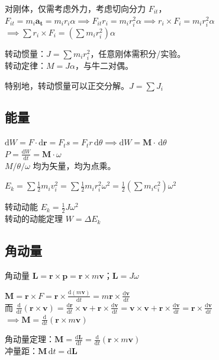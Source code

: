 \documentclass[12pt, a4paper, UTF8, openany]{ctexbook}
\newcommand{\dif}{\mathrm{d}}
\newcommand{\sdif}{\,\mathrm{d}}
\newcommand{\vect}[1]{\mathbf{#1}}
\newcommand{\vecr}{\vect{r}}
\newcommand{\vecv}{\vect{v}}
\newcommand{\vecat}{\vect{a_{t}}}
\newcommand{\vecp}{\vect{p}}
\newcommand{\vecm}{\vect{M}}
\newcommand{\vecl}{\vect{L}}
\newcommand{\cross}{\times}
\begin{document}
        对刚体，仅需考虑外力，考虑切向分力 $F_{it}$，
        $F_{it} = m_i\vecat = m_i r_i \alpha \implies F_{it} r_i = m_i r_i^2 \alpha 
        \implies r_i \cross F_i = m_i r_i^2 \alpha$ \\
        $\implies \sum r_i \cross F_i = (\sum m_i r_i^2) \alpha$

        转动惯量：$J = \sum m_i r_i^2$，任意刚体需积分/实验。\\
        转动定律：$M = J \alpha$，与牛二对偶。

        特别地，{\heiti 转动惯量可以正交分解}。$J = \sum J_i$

        \subsection{能量}
        $\dif W = F \cdot \dif \vecr = F_{t} s = F_{t} r \sdif\theta \implies \dif W = \vecm \cdot \sdif\theta$ \\
        $P = \frac{\dif W}{\dif t} = \vecm \cdot \omega$ \\
        $M/\theta/\omega$ 均为矢量，均为点乘。

        $E_{k} = \sum \frac{1}{2} m_i v_i^2 = \sum \frac{1}{2} m_i r_i^2 \omega^2 
        = \frac{1}{2}(\sum m_i c_i^2)\omega^2$

        转动动能 $E_{k} = \frac{1}{2} J \omega^2$ \\
        转动的动能定理 $W = \Delta E_{k}$

        \subsection{角动量}
        角动量 $\vecl = \vecr \cross \vecp = \vecr \cross m\vecv$；$\vecl = J\omega$

        $\vecm = \vecr \cross F = \vecr \cross \frac{\dif (m\vecv)}{\dif t} 
        = m \vecr \cross \frac{\dif \vecv}{\dif t}$ \\
        而 $\frac{\dif}{\dif t}(\vecr \cross \vecv) = \frac{\dif \vecr}{\dif t} \cross \vecv + 
        \vecr \cross \frac{\dif \vecv}{\dif t} = \vecv \cross \vecv + \vecr \cross \frac{\dif \vecv}{\dif t} 
        = \vecr \cross \frac{\dif \vecv}{\dif t}$ \\
        $\implies \vecm = \frac{\dif}{\dif t} (\vecr \cross m\vecv)$

        角动量定理：$\vecm = \frac{\dif \vecl}{\dif t} = \frac{\dif}{\dif t} (\vecr \cross m\vecv)$ \\
        冲量距：$\vecm \sdif t = \dif \vecl$
\end{document}
